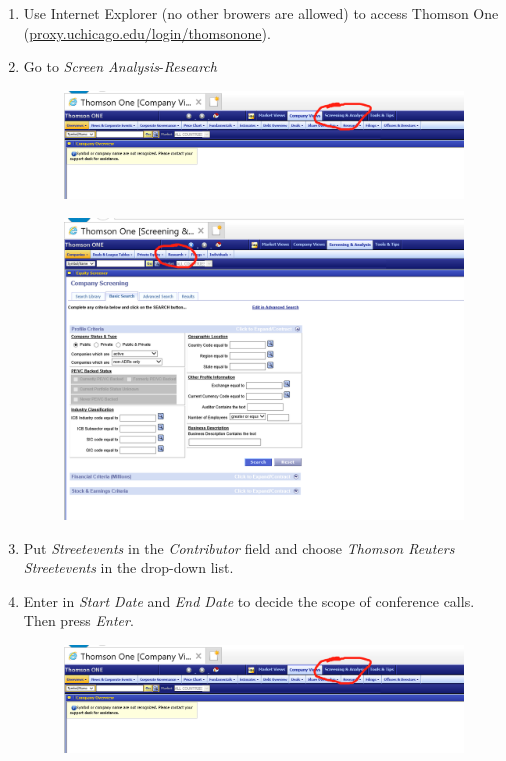 \documentclass[11pt]{article}
\begin{document}
\begin{enumerate}
	\item Use Internet Explorer (no other browers are allowed) to access Thomson One (\url{proxy.uchicago.edu/login/thomsonone}).
	\item Go to \textit{Screen Analysis}-\textit{Research}
	\begin{figure}[H]
	\begin{center}
	\includegraphics[width=.7\textwidth]{Figures/open_step1.png}
	\end{center}
	\end{figure}
	\begin{figure}[H]
	\begin{center}
	\includegraphics[width=.7\textwidth]{Figures/open_step2.png}
	\end{center}
	\end{figure}
	\item Put \textit{Streetevents} in the \textit{Contributor} field and choose \textit{Thomson Reuters Streetevents} in the drop-down list.
	\item Enter in \textit{Start Date} and \textit{End Date} to decide the scope of conference calls. Then press \textit{Enter}.
	\begin{figure}[H]
	\begin{center}
	\includegraphics[width=.7\textwidth]{Figures/open_step1.png}

\end{center}
\end{figure}
\end{enumerate}
\end{document}
